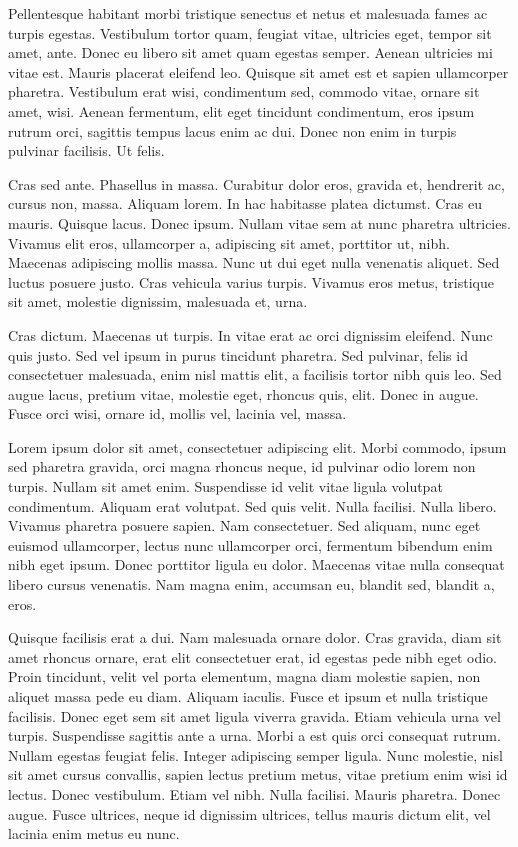 Pellentesque habitant morbi tristique senectus et netus et malesuada fames ac turpis egestas. Vestibulum tortor quam, feugiat vitae, ultricies eget, tempor sit amet, ante. Donec eu libero sit amet quam egestas semper. Aenean ultricies mi vitae est. Mauris placerat eleifend leo. Quisque sit amet est et sapien ullamcorper pharetra. Vestibulum erat wisi, condimentum sed, commodo vitae, ornare sit amet, wisi. Aenean fermentum, elit eget tincidunt condimentum, eros ipsum rutrum orci, sagittis tempus lacus enim ac dui. Donec non enim in turpis pulvinar facilisis. Ut felis.

Cras sed ante. Phasellus in massa. Curabitur dolor eros, gravida et, hendrerit ac, cursus non, massa. Aliquam lorem. In hac habitasse platea dictumst. Cras eu mauris. Quisque lacus. Donec ipsum. Nullam vitae sem at nunc pharetra ultricies. Vivamus elit eros, ullamcorper a, adipiscing sit amet, porttitor ut, nibh. Maecenas adipiscing mollis massa. Nunc ut dui eget nulla venenatis aliquet. Sed luctus posuere justo. Cras vehicula varius turpis. Vivamus eros metus, tristique sit amet, molestie dignissim, malesuada et, urna.

Cras dictum. Maecenas ut turpis. In vitae erat ac orci dignissim eleifend. Nunc quis justo. Sed vel ipsum in purus tincidunt pharetra. Sed pulvinar, felis id consectetuer malesuada, enim nisl mattis elit, a facilisis tortor nibh quis leo. Sed augue lacus, pretium vitae, molestie eget, rhoncus quis, elit. Donec in augue. Fusce orci wisi, ornare id, mollis vel, lacinia vel, massa.

Lorem ipsum dolor sit amet, consectetuer adipiscing elit. Morbi commodo, ipsum sed pharetra gravida, orci magna rhoncus neque, id pulvinar odio lorem non turpis. Nullam sit amet enim. Suspendisse id velit vitae ligula volutpat condimentum. Aliquam erat volutpat. Sed quis velit. Nulla facilisi. Nulla libero. Vivamus pharetra posuere sapien. Nam consectetuer. Sed aliquam, nunc eget euismod ullamcorper, lectus nunc ullamcorper orci, fermentum bibendum enim nibh eget ipsum. Donec porttitor ligula eu dolor. Maecenas vitae nulla consequat libero cursus venenatis. Nam magna enim, accumsan eu, blandit sed, blandit a, eros.

Quisque facilisis erat a dui. Nam malesuada ornare dolor. Cras gravida, diam sit amet rhoncus ornare, erat elit consectetuer erat, id egestas pede nibh eget odio. Proin tincidunt, velit vel porta elementum, magna diam molestie sapien, non aliquet massa pede eu diam. Aliquam iaculis. Fusce et ipsum et nulla tristique facilisis. Donec eget sem sit amet ligula viverra gravida. Etiam vehicula urna vel turpis. Suspendisse sagittis ante a urna. Morbi a est quis orci consequat rutrum. Nullam egestas feugiat felis. Integer adipiscing semper ligula. Nunc molestie, nisl sit amet cursus convallis, sapien lectus pretium metus, vitae pretium enim wisi id lectus. Donec vestibulum. Etiam vel nibh. Nulla facilisi. Mauris pharetra. Donec augue. Fusce ultrices, neque id dignissim ultrices, tellus mauris dictum elit, vel lacinia enim metus eu nunc.

